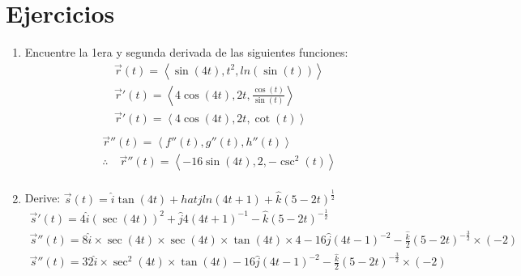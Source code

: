 \section{Ejercicios}
\begin{enumerate}
    \item Encuentre la 1era y segunda derivada de las siguientes funciones:
        \begin{align*}
            \vec{r}(t) = \left\langle \sin(4t),t^2,ln(\sin(t)) \right\rangle \\ 
            \vec{r}'(t) = \left\langle 4\cos(4t),2t,\frac{\cos(t)}{\sin(t)}  \right\rangle \\ 
            \vec{r}'(t) = \left\langle 4\cos(4t),2t,\cot(t) \right\rangle \\ 
        \end{align*}
        \begin{align*}
            \vec{r}''(t) = \left\langle f''(t),g''(t),h''(t) \right\rangle \\ 
            \therefore \quad \vec{r}''(t) = \left\langle -16\sin(4t),2,-\csc^2(t) \right\rangle \\ 
        \end{align*}
    
    \item Derive: $\vec{s}(t) = \hat{i} \tan(4t) + hat{j}ln(4t+1) + \hat{k} (5-2t)^{\frac{1}{2} }$
        \begin{align*}
            \vec{s}'(t) = 4 \hat{i} (\sec(4t))^2 + \hat{j} 4(4t+1)^{-1} -\hat{k} (5-2t)^{-\frac{1}{2} } \\ 
            \vec{s}''(t) = 8 \hat{i} \times \sec(4t)\times  \sec(4t)\times  \tan (4t) \times 4  - 16 \hat{j} (4t-1)^{-2} - \frac{\hat{k}}{2} (5-2t)^{-\frac{3}{2} } \times (-2) \\  
            \vec{s}''(t) = 32 \hat{i} \times \sec^2(4t)\times  \tan (4t)  - 16 \hat{j} (4t-1)^{-2} - \frac{\hat{k}}{2} (5-2t)^{-\frac{3}{2} } \times (-2) \\ 
        \end{align*}
\end{enumerate}


